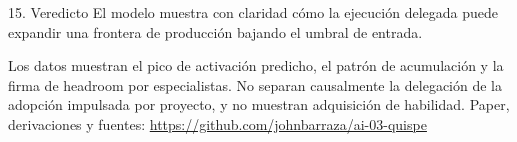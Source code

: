 \documentclass[aspectratio=169,10pt]{beamer}
\begin{document}
\begin{frame}{15. Veredicto}
\Large
El modelo muestra con claridad cómo la ejecución delegada puede expandir una \alert{frontera de producción} bajando el umbral de entrada.
\vspace{.8em}

\normalsize
Los datos muestran el pico de activación predicho, el patrón de acumulación y la firma de headroom por especialistas. No separan causalmente la delegación de la adopción impulsada por proyecto, y no muestran adquisición de habilidad.
\vfill
\small Paper, derivaciones y fuentes: \url{https://github.com/johnbarraza/ai-03-quispe}
\end{frame}
\end{document}
